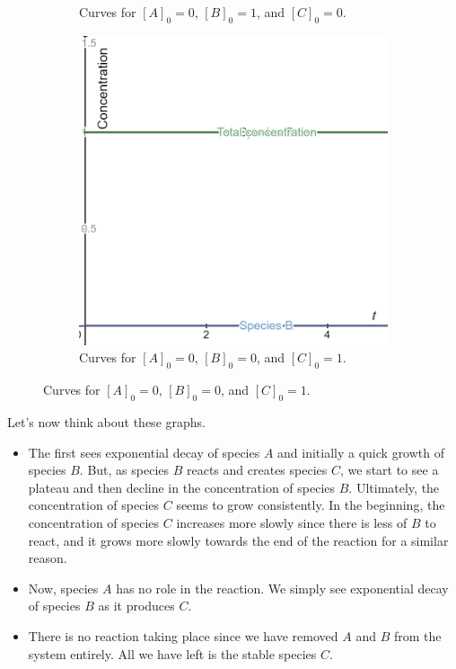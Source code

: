 \documentclass[12pt]{article} %
\begin{document}
\begin{solution}
\begin{enumerate}[(a)]
\begin{figure}[H]
\begin{subfigure}[b]{0.3\textwidth}
            \caption{Curves for $[A]_0=0$, $[B]_0=1$, and $[C]_0=0$.}
        \end{subfigure}
        \hfill
        \begin{subfigure}[b]{0.3\textwidth}
            \centering
            \includegraphics[width=\textwidth]{a00b00c01.png}
            \caption{Curves for $[A]_0=0$, $[B]_0=0$, and $[C]_0=1$.}
        \end{subfigure}
    \end{figure}
    
    Let's now think about these graphs.
    \begin{itemize}
            \item The first sees exponential decay of species $A$ and initially a quick growth of species $B$.  But, as species $B$ reacts and creates species $C$, we start to see a plateau and then decline in the concentration of species $B$.  Ultimately, the concentration of species $C$ seems to grow consistently.  In the beginning, the concentration of species $C$ increases more slowly since there is less of $B$ to react, and it grows more slowly towards the end of the reaction for a similar reason.
            \item Now, species $A$ has no role in the reaction.  We simply see exponential decay of species $B$ as it produces $C$.
            \item There is no reaction taking place since we have removed $A$ and $B$ from the system entirely.  All we have left is the stable species $C$.
    \end{itemize}


\end{enumerate}
\end{solution}
\end{document}
